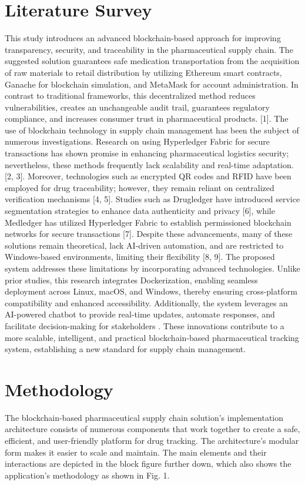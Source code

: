 \documentclass[conference]{IEEEtran}
\begin{document}
\section{Literature Survey}
This study introduces an advanced blockchain-based approach for improving transparency, security, and traceability in the pharmaceutical supply chain. The suggested solution guarantees safe medication transportation from the acquisition of raw materials to retail distribution by utilizing Ethereum smart contracts, Ganache for blockchain simulation, and MetaMask for account administration. In contrast to traditional frameworks, this decentralized method reduces vulnerabilities, creates an unchangeable audit trail, guarantees regulatory compliance, and increases consumer trust in pharmaceutical products. 
[1].
The use of blockchain technology in supply chain management has been the subject of numerous investigations. Research on using Hyperledger Fabric for secure transactions has shown promise in enhancing pharmaceutical logistics security; nevertheless, these methods frequently lack scalability and real-time adaptation. [2, 3]. Moreover, technologies such as encrypted QR codes and RFID have been employed for drug traceability; however, they remain reliant on centralized verification mechanisms [4, 5]. Studies such as Drugledger have introduced service segmentation strategies to enhance data authenticity and privacy [6], while Medledger has utilized Hyperledger Fabric to establish permissioned blockchain networks for secure transactions [7]. Despite these advancements, many of these solutions remain theoretical, lack AI-driven automation, and are restricted to Windows-based environments, limiting their flexibility [8, 9].
The proposed system addresses these limitations by incorporating advanced technologies. Unlike prior studies, this research integrates Dockerization, enabling seamless deployment across Linux, macOS, and Windows, thereby ensuring cross-platform compatibility and enhanced accessibility. Additionally, the system leverages an AI-powered chatbot to provide real-time updates, automate responses, and facilitate decision-making for stakeholders . These innovations contribute to a more scalable, intelligent, and practical blockchain-based pharmaceutical tracking system, establishing a new standard for supply chain management.



\section{Methodology}
The blockchain-based pharmaceutical supply chain solution's implementation architecture consists of numerous components that work together to create a safe, efficient, and user-friendly platform for drug tracking. The architecture's modular form makes it easier to scale and maintain. The main elements and their interactions are depicted in the block figure further down, which also shows the application's methodology as shown in Fig. 1.
\end{document}
